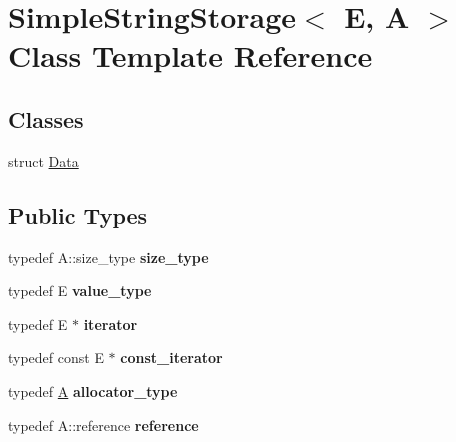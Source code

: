 \hypertarget{classSimpleStringStorage}{}\section{Simple\+String\+Storage$<$ E, A $>$ Class Template Reference}
\label{classSimpleStringStorage}
\subsection*{Classes}
\begin{DoxyCompactItemize}
\item 
struct \hyperlink{structSimpleStringStorage_1_1Data}{Data}
\end{DoxyCompactItemize}
\subsection*{Public Types}
\begin{DoxyCompactItemize}
\item 
\hypertarget{classSimpleStringStorage_ab6f22062aca049096e409926287ccb06}{}typedef A\+::size\+\_\+type {\bfseries size\+\_\+type}\label{classSimpleStringStorage_ab6f22062aca049096e409926287ccb06}

\item 
\hypertarget{classSimpleStringStorage_a856d0eeb942fc65e38839f7ecd286392}{}typedef E {\bfseries value\+\_\+type}\label{classSimpleStringStorage_a856d0eeb942fc65e38839f7ecd286392}

\item 
\hypertarget{classSimpleStringStorage_a69dcf041360cedc762351c72896d393d}{}typedef E $\ast$ {\bfseries iterator}\label{classSimpleStringStorage_a69dcf041360cedc762351c72896d393d}

\item 
\hypertarget{classSimpleStringStorage_a801413c099d6cf88abdd96ea6123f473}{}typedef const E $\ast$ {\bfseries const\+\_\+iterator}\label{classSimpleStringStorage_a801413c099d6cf88abdd96ea6123f473}

\item 
\hypertarget{classSimpleStringStorage_ae2ba203d1f0d37c0a25a1205e4c2f726}{}typedef \hyperlink{structA}{A} {\bfseries allocator\+\_\+type}\label{classSimpleStringStorage_ae2ba203d1f0d37c0a25a1205e4c2f726}

\item 
\hypertarget{classSimpleStringStorage_a37cbe19721e9d2f31f589ba437ec504d}{}typedef A\+::reference {\bfseries reference}\label{classSimpleStringStorage_a37cbe19721e9d2f31f589ba437ec504d}

\end{DoxyCompactItemize}

